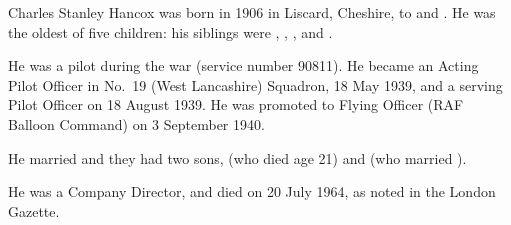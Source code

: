 
Charles Stanley Hancox was born in 1906 in Liscard, Cheshire, to  and .\cite{CSHancoxBirth} He was the oldest of five children: his siblings were , , , and .

He was a pilot during the war (service number 90811).
He became an Acting Pilot Officer in No.~19 (West Lancashire) Squadron, 18 May 1939, \cite{CSHancox1} and a serving Pilot Officer on 18 August 1939. \cite{CSHancox2}  He was promoted to Flying Officer (RAF Balloon Command) on 3 September 1940. \cite{CSHancox3}

He married  and they had two sons,  (who died age 21) and  (who married ).

He was a Company Director, and died on 20 July 1964, as noted in the London Gazette. \cite{CSHancoxDeath}
